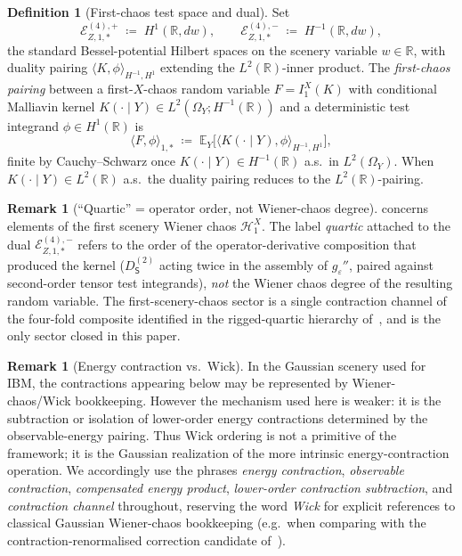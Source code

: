 \documentclass[11pt,reqno]{amsart}
\theoremstyle{plain}
\theoremstyle{definition}
\newtheorem{definition}[theorem]{Definition}
\newtheorem{remark}[theorem]{Remark}
\theoremstyle{remark}
\newcommand{\R}{\mathbb{R}}
\newcommand{\E}{\mathbb{E}}
\newcommand{\Hilb}{\mathcal{H}}
\newcommand{\Energy}{\mathcal{E}}
\newcommand{\Source}{\mathsf{S}}
\newcommand{\IBM}{Z}
\begin{document}
\begin{definition}[First-chaos test space and dual]\label{def:first-chaos-block}
Set
\[
 \Energy_{\IBM,1,*}^{(4),+}\;\coloneqq\;H^{1}(\R,dw),
 \qquad
 \Energy_{\IBM,1,*}^{(4),-}\;\coloneqq\;H^{-1}(\R,dw),
\]
the standard Bessel-potential Hilbert spaces on the scenery variable
$w\in\R$, with duality pairing
$\langle K,\phi\rangle_{H^{-1},H^{1}}$ extending the
$L^{2}(\R)$-inner product. The \emph{first-chaos pairing} between a
first-$X$-chaos random variable $F=I_{1}^{X}(K)$ with conditional
Malliavin kernel $K(\cdot\mid Y)\in L^{2}(\Omega_{Y};H^{-1}(\R))$
and a deterministic test integrand $\phi\in H^{1}(\R)$ is
\[
 \bigl\langle F,\phi\bigr\rangle_{1,*}
 \;\coloneqq\;\E_{Y}\!\bigl[\langle K(\cdot\mid Y),\phi\rangle_{H^{-1},H^{1}}\bigr],
\]
finite by Cauchy--Schwarz once $K(\cdot\mid Y)\in H^{-1}(\R)$ a.s.\ in
$L^{2}(\Omega_{Y})$. When $K(\cdot\mid Y)\in L^{2}(\R)$ a.s.\ the
duality pairing reduces to the $L^{2}(\R)$-pairing.
\end{definition}

\begin{remark}[``Quartic'' = operator order, not Wiener-chaos degree]
\label{rem:quartic-not-chaos}
 concerns elements of the first scenery
Wiener chaos $\Hilb_{1}^{X}$. The label \emph{quartic} attached to
the dual $\Energy_{\IBM,1,*}^{(4),-}$ refers to the order of the
operator-derivative composition that produced the kernel
($D_{\Source}^{(2)}$ acting twice in the assembly of
$g_{\varepsilon}''$, paired against second-order tensor test
integrands), \emph{not} the Wiener chaos degree of the resulting
random variable. The first-scenery-chaos sector is a single
contraction channel of the four-fold composite identified in the
rigged-quartic hierarchy of~\cite{Fontes-EnergyFirst}, and is the
only sector closed in this paper.
\end{remark}

\begin{remark}[Energy contraction vs.\ Wick]\label{rem:energy-contraction}
In the Gaussian scenery used for IBM, the contractions appearing
below may be represented by Wiener-chaos/Wick bookkeeping. However
the mechanism used here is weaker: it is the subtraction or
isolation of lower-order energy contractions determined by the
observable-energy pairing. Thus Wick ordering is not a primitive
of the framework; it is the Gaussian realization of the more
intrinsic energy-contraction operation. We accordingly use the
phrases \emph{energy contraction}, \emph{observable contraction},
\emph{compensated energy product}, \emph{lower-order contraction
subtraction}, and \emph{contraction channel} throughout, reserving
the word \emph{Wick} for explicit references to classical Gaussian
Wiener-chaos bookkeeping (e.g.\ when comparing with the
contraction-renormalised correction candidate
of~\cite{Fontes-EnergyFirst}).
\end{remark}
\end{document}
